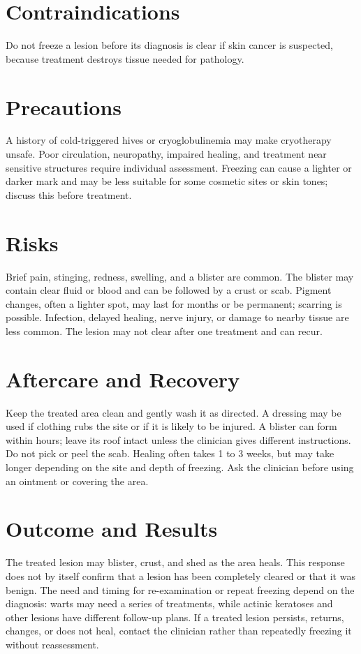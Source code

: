\section*{Contraindications}
Do not freeze a lesion before its diagnosis is clear if skin cancer is suspected, because treatment destroys tissue needed for pathology.

\section*{Precautions}
A history of cold-triggered hives or cryoglobulinemia may make cryotherapy unsafe. Poor circulation, neuropathy, impaired healing, and treatment near sensitive structures require individual assessment. Freezing can cause a lighter or darker mark and may be less suitable for some cosmetic sites or skin tones; discuss this before treatment.

\section*{Risks}
Brief pain, stinging, redness, swelling, and a blister are common. The blister may contain clear fluid or blood and can be followed by a crust or scab. Pigment changes, often a lighter spot, may last for months or be permanent; scarring is possible. Infection, delayed healing, nerve injury, or damage to nearby tissue are less common. The lesion may not clear after one treatment and can recur.

\section*{Aftercare and Recovery}
Keep the treated area clean and gently wash it as directed. A dressing may be used if clothing rubs the site or if it is likely to be injured. A blister can form within hours; leave its roof intact unless the clinician gives different instructions. Do not pick or peel the scab. Healing often takes 1 to 3 weeks, but may take longer depending on the site and depth of freezing. Ask the clinician before using an ointment or covering the area.

\section*{Outcome and Results}
The treated lesion may blister, crust, and shed as the area heals. This response does not by itself confirm that a lesion has been completely cleared or that it was benign. The need and timing for re-examination or repeat freezing depend on the diagnosis: warts may need a series of treatments, while actinic keratoses and other lesions have different follow-up plans. If a treated lesion persists, returns, changes, or does not heal, contact the clinician rather than repeatedly freezing it without reassessment.


